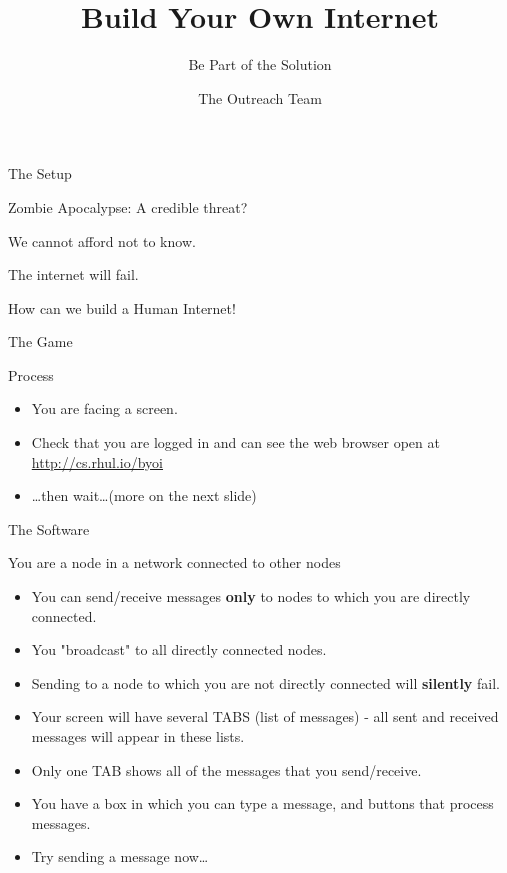 \documentclass[svgnames]{beamer}
\title{Build Your Own Internet}
\subtitle{Be Part of the Solution}
\author %
{The Outreach Team}
\date{}
\institute[RHUL] %
{
  Department of Computer Science\\
  Royal Holloway College\\
  University of London
}
\begin{document}
\begin{frame}
  \titlepage
\end{frame}

\begin{frame}{The Setup}
\begin{alertblock}{Zombie Apocalypse: A credible threat?
}
\begin{center}

We cannot afford not to know.  

The internet will fail.  

How can we build a Human Internet!
\end{center}
\end{alertblock}
\end{frame}
\begin{frame}{The Game}
\begin{block}{Process}
\begin{itemize}
\item You are facing a screen.
\item Check that you are logged in and can see the web browser open at \url{http://cs.rhul.io/byoi}
\item \dots then wait\ldots (more on the next slide)
\end{itemize}
\end{block}
\end{frame}
\begin{frame}{The Software}
\begin{block}{You are a node in a network connected to other nodes}
\begin{itemize}
\item You can send/receive messages \textbf{only} to nodes to which you are \alert{directly} connected.
\item You "broadcast" to all \alert{directly} connected nodes.
\item Sending to a node to which you are not \alert{directly} connected will \textbf{silently} fail.
\item Your screen will have several TABS (list of messages) - all sent and received messages will appear in these lists.
\item Only one TAB shows \alert{all} of the messages that you send/receive.
\item You have a box in which you can type a message, and buttons that process messages.
\item \alert{Try sending a message now\ldots}
\end{itemize}
\end{block}
\end{frame}
\end{document}
